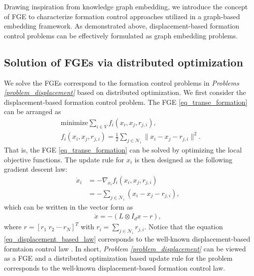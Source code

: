 \documentclass{ifacconf}
\begin{document}
Drawing inspiration from knowledge graph embedding, we introduce the concept of FGE to characterize formation control approaches utilized in a graph-based embedding framework. 
As demonstrated above, displacement-based formation control problems can be effectively formulated as graph embedding problems.

\subsection{Solution of FGEs via distributed optimization}
We solve the FGEs correspond to the formation control problems in \textit{Problems \ref{problem_displacement}} based on distributed optimization. We first consider the displacement-based formation control problem. The FGE \eqref{eq_transe_formation} can be arranged as
\begin{align*}
& \textrm{minimize} \sum_{i \in V}f_i(x_i,x_j,r_{j,i}), \\
 & f_i(x_i,x_j,r_{j,i}) = \frac{1}{2} \sum_{j \in \mathcal{N}_i} \| x_i - x_j - {r_{j,i}} \|^2.
\end{align*}
That is, the FGE \eqref{eq_transe_formation} can be solved by optimizing the local objective functions. The update rule for $x_i$ is then designed as the following gradient descent law:
\begin{align*}
\dot{x}_i &= - \nabla_{x_i} f_i (x_i , x_j,r_{j,i}) \\
               &= -\sum_{j \in \mathcal{N}_i} (x_i - x_j - r_{j,i}),
\end{align*}
which can be written in the vector form as
\begin{align} \label{eq_displacement_based_law}
\dot{x} = -(L \otimes I_{d} x-r),
\end{align}
where $r = [r_1 \; r_2 \; \cdots \: r_N]^T$ with $r_i = \sum_{j \in \mathcal{N}_i} r_{j,i}$. Notice that the equation \eqref{eq_displacement_based_law} corresponds to the well-known displacement-based formtaion control law \citep{olfati-saber2004consensus,ren2005consensus,lin2007state,dimarogonas2008connection,oh2015survey}. In short, \textit{Problem \ref{problem_displacement}} can be viewed as a FGE and a distributed optimization based update rule for the problem corresponds to the well-known displacement-based formation control law.
\end{document}
